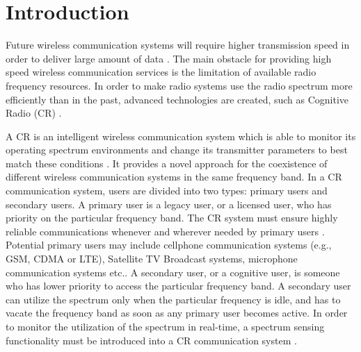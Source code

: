 \chapter{Introduction}
Future wireless communication systems will require higher transmission speed in order to deliver large amount of data \cite{pelcat20133gpp}. The main obstacle for providing high speed wireless communication services is the limitation of available radio frequency resources. In order to make radio systems use the radio spectrum more efficiently than in the past, advanced technologies are created, such as Cognitive Radio (CR) \cite{federal2005notice}. 

A CR is an intelligent wireless communication system which is able to monitor its operating spectrum environments and change its transmitter parameters to best match these conditions \cite{wang2011advances, a001}. It provides a novel approach for the coexistence of different wireless communication systems in the same frequency band. In a CR communication system, users are divided into two types: primary users and secondary users. A primary user is a legacy user, or a licensed user, who has priority on the particular frequency band. The CR system must ensure highly reliable communications whenever and wherever needed by primary users \cite{a001}. Potential primary users may include cellphone communication systems (e.g., GSM, CDMA or LTE), Satellite TV Broadcast systems, microphone communication systems etc.. A secondary user, or a cognitive user, is someone who has lower priority to access the particular frequency band. A secondary user can utilize the spectrum only when the particular frequency is idle, and has to vacate the frequency band as soon as any primary user becomes active. 
In order to monitor the utilization of the spectrum in real-time, a spectrum sensing functionality must be introduced into a CR communication system \cite{buddhikot2007understanding, tandra2009spectrum}.   

